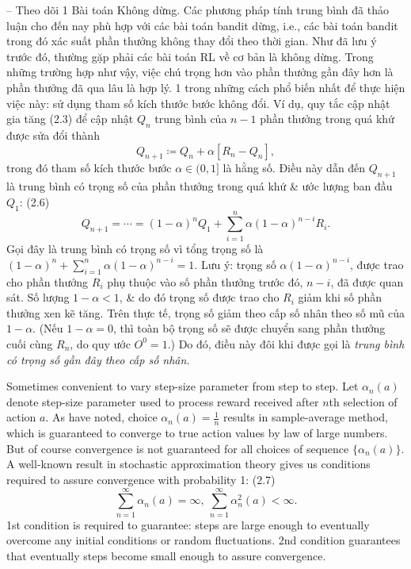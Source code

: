 \documentclass{article}
\begin{document}
\begin{itemize}
\begin{itemize}
        -- {\sf Theo dõi 1 Bài toán Không dừng.} Các phương pháp tính trung bình đã thảo luận cho đến nay phù hợp với các bài toán bandit dừng, i.e., các bài toán bandit trong đó xác suất phần thưởng không thay đổi theo thời gian. Như đã lưu ý trước đó, thường gặp phải các bài toán RL về cơ bản là không dừng. Trong những trường hợp như vậy, việc chú trọng hơn vào phần thưởng gần đây hơn là phần thưởng đã qua lâu là hợp lý. 1 trong những cách phổ biến nhất để thực hiện việc này: sử dụng tham số kích thước bước không đổi. Ví dụ, quy tắc cập nhật gia tăng (2.3) để cập nhật $Q_n$ trung bình của $n - 1$ phần thưởng trong quá khứ được sửa đổi thành
        \begin{equation*}
            Q_{n+1}\coloneqq Q_n + \alpha[R_n - Q_n],
        \end{equation*}
        trong đó tham số kích thước bước $\alpha\in(0,1]$ là hằng số. Điều này dẫn đến $Q_{n+1}$ là trung bình có trọng số của phần thưởng trong quá khứ \& ước lượng ban đầu $Q_1$: (2.6)
        \begin{equation*}
            Q_{n+1} = \cdots = (1 - \alpha)^nQ_1 + \sum_{i=1}^n \alpha(1 - \alpha)^{n - i}R_i.
        \end{equation*}
        Gọi đây là trung bình có trọng số vì tổng trọng số là $(1 - \alpha)^n + \sum_{i=1}^n \alpha(1 - \alpha)^{n - i} = 1$. Lưu ý: trọng số $\alpha(1 - \alpha)^{n-i}$, được trao cho phần thưởng $R_i$ phụ thuộc vào số phần thưởng trước đó, $n - i$, đã được quan sát. Số lượng $1 - \alpha < 1$, \& do đó trọng số được trao cho $R_i$ giảm khi số phần thưởng xen kẽ tăng. Trên thực tế, trọng số giảm theo cấp số nhân theo số mũ của $1 - \alpha$. (Nếu $1 - \alpha = 0$, thì toàn bộ trọng số sẽ được chuyển sang phần thưởng cuối cùng $R_n$, do quy ước $O^0 = 1$.) Do đó, điều này đôi khi được gọi là {\it trung bình có trọng số gần đây theo cấp số nhân}.

        Sometimes convenient to vary step-size parameter from step to step. Let $\alpha_n(a)$ denote step-size parameter used to process reward received after $n$th selection of action $a$. As have noted, choice $\alpha_n(a) = \frac{1}{n}$ results in sample-average method, which is guaranteed to converge to true action values by law of large numbers. But of course convergence is not guaranteed for all choices of sequence $\{\alpha_n(a)\}$. A well-known result in stochastic approximation theory gives us conditions required to assure convergence with probability 1: (2.7)
        \begin{equation*}
            \sum_{n=1}^\infty \alpha_n(a) = \infty,\  \sum_{n=1}^\infty \alpha_n^2(a) < \infty.
        \end{equation*}
        1st condition is required to guarantee: steps are large enough to eventually overcome any initial conditions or random fluctuations. 2nd condition guarantees that eventually steps become small enough to assure convergence.


\end{itemize}
\end{itemize}
\end{document}
